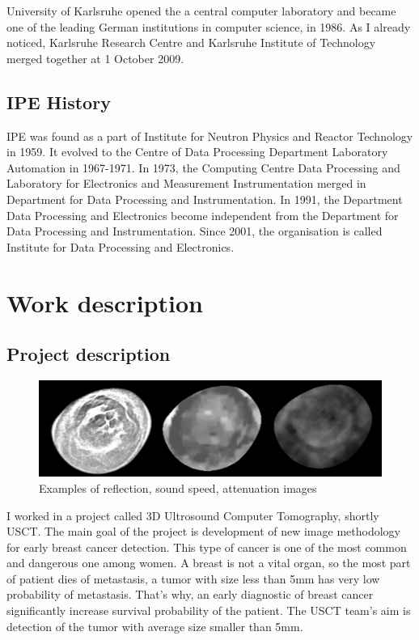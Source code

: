 \documentclass[english]{article}
\begin{document}
University of Karlsruhe opened the a central computer laboratory and became one of the leading German institutions in computer science, in 1986. As I already noticed, Karlsruhe Research Centre and Karlsruhe Institute of Technology merged together at 1 October 2009.

\subsection{IPE History}

IPE was found as a part of Institute for Neutron Physics and Reactor Technology in 1959. It evolved to the Centre of Data Processing Department Laboratory Automation in 1967-1971. In 1973, the Computing Centre Data Processing and Laboratory for Electronics and Measurement Instrumentation merged in Department for Data Processing and Instrumentation. In 1991, the Department Data Processing and Electronics become independent from the Department for Data Processing and Instrumentation. Since 2001, the organisation is called Institute for Data Processing and Electronics.

\section{Work description}
\subsection{Project description}
\begin{figure}
\centerline{\includegraphics[scale=0.5]{internship_report/images.png}}
\caption{Examples of reflection, sound speed, attenuation images\label{fig:example}}
\end{figure}
I worked in a project called 3D Ultrosound Computer Tomography, shortly USCT. The main goal of the project is development of new image methodology for early breast cancer detection. This type of cancer is one of the most common and dangerous one among women. A breast is not a vital organ, so the most part of patient dies of metastasis, a tumor with size less than 5mm has very low probability of metastasis.  That's why, an early diagnostic of breast cancer significantly increase survival probability of the patient. The USCT team's aim is detection of the tumor with average size smaller than 5mm. 
\end{document}
